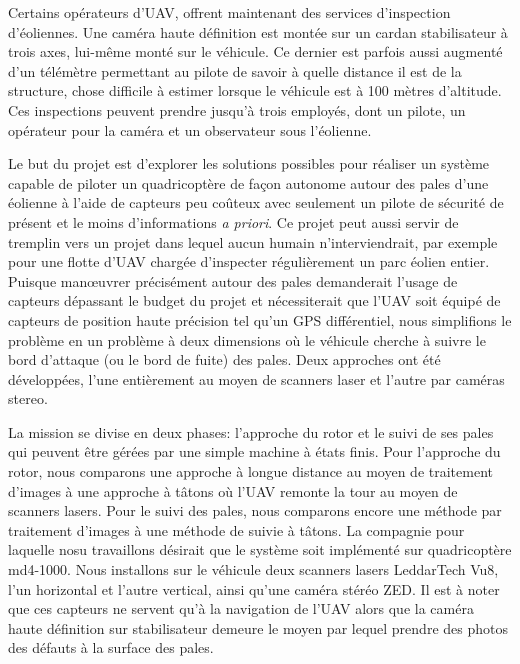 Certains opérateurs d'UAV, offrent maintenant des services d'inspection d'éoliennes. Une caméra haute définition est montée sur un cardan stabilisateur à trois axes, lui-même monté sur le véhicule. Ce dernier est parfois aussi augmenté d'un télémètre permettant au pilote de savoir à quelle distance il est de la structure, chose difficile à estimer lorsque le véhicule est à 100 mètres d'altitude. Ces inspections peuvent prendre jusqu'à trois employés, dont un pilote, un opérateur pour la caméra et un observateur sous l'éolienne.

Le but du projet est d'explorer les solutions possibles pour réaliser un système capable de piloter un quadricoptère de façon autonome autour des pales d'une éolienne à l'aide de capteurs peu coûteux avec seulement un pilote de sécurité de présent et le moins d'informations \emph{a priori}. Ce projet peut aussi servir de tremplin vers un projet dans lequel aucun humain n'interviendrait, par exemple pour une flotte d'UAV chargée d'inspecter régulièrement un parc éolien entier. Puisque man\oe uvrer précisément autour des pales demanderait l'usage de capteurs dépassant le budget du projet et nécessiterait que l'UAV soit équipé de capteurs de position haute précision tel qu'un GPS différentiel, nous simplifions le problème en un problème à deux dimensions où le véhicule cherche à suivre le bord d'attaque (ou le bord de fuite) des pales. Deux approches ont été développées, l'une entièrement au moyen de scanners laser et l'autre par caméras stereo.

La mission se divise en deux phases: l'approche du rotor et le suivi de ses pales qui peuvent être gérées par une simple machine à états finis. Pour l'approche du rotor, nous comparons une approche à longue distance au moyen de traitement d'images à une approche à tâtons où l'UAV remonte la tour au moyen de scanners lasers. Pour le suivi des pales, nous comparons encore une méthode par traitement d'images à une méthode de suivie à tâtons. La compagnie pour laquelle nosu travaillons désirait que le système soit implémenté sur
quadricoptère md4-1000. Nous installons sur le véhicule deux scanners lasers LeddarTech Vu8, l'un horizontal et l'autre vertical, ainsi qu'une caméra stéréo ZED. Il est à noter que ces capteurs ne servent qu'à la navigation de l'UAV alors que la caméra haute définition sur stabilisateur demeure le moyen par lequel prendre des photos des défauts à la surface des pales.


